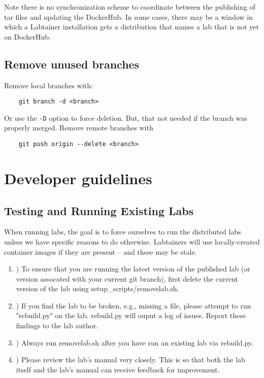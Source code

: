 \documentclass[12pt]{article}
\begin{document}
Note there is no synchronization scheme to coordinate between the publishing of tar files and updating the
DockerHub.  In some cases, there may be a window in which a Labtainer installation gets a distribution that names
a lab that is not yet on DockerHub.

\subsection{Remove unused branches}
Remove local branches with:
\begin{verbatim}
    git branch -d <branch>
\end{verbatim}
\noindent Or use the {\tt -D} option to force deletion.  But, that not needed if the branch was properly merged.
Remove remote branches with 
\begin{verbatim}
    git push origin --delete <branch>
\end{verbatim}

\section{Developer guidelines}
\subsection{Testing and Running Existing Labs}
When running labs, the goal is to force ourselves to run the distributed labs unless we have specific reasons to do otherwise.
Labtainers will use locally-created container images if they are present -- and these may be stale.
\begin{enumerate}[label=\Alph*]
	\item )   To ensure that you are running the latest version of the published lab (or version assocated with your current git branch), first delete the current version of the lab using setup\_scripts/removelab.sh.  

	\item )   If you find the lab to be broken, e.g., missing a file, please attempt to run "rebuild.py" on the lab. rebuild.py will ouput a log of issues. Report these findings to the lab author.  

	\item )   Always run removelab.sh after you have run an existing lab via rebuild.py.  

	\item )   Please review the lab's manual very closely. This is so that both the lab itself and the lab's manual can receive feedback for improvement. 
\end{enumerate}
\end{document}
